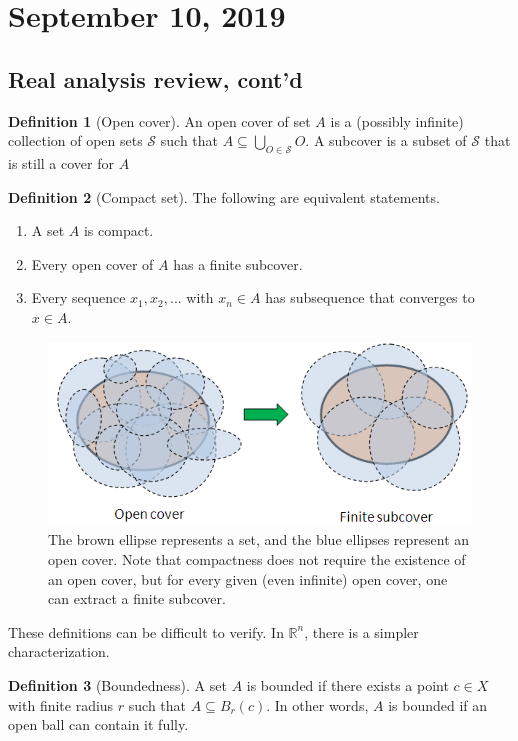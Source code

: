 \documentclass[11pt]{article}
\newcommand{\R}{\ensuremath{\mathbb R}}
\newcommand{\sse}{\subseteq}
\theoremstyle{plain}
\theoremstyle{definition}
\newtheorem{defi}{Definition}[section]
\theoremstyle{remark}
\begin{document}
\section{September 10, 2019}

\subsection{Real analysis review, cont'd}

\begin{defi}[Open cover]
    An open cover of set $A$ is a (possibly infinite) collection of open sets $\mathcal{S}$ such that $A \sse \bigcup_{O \in \mathcal{S}} O$. A subcover is a subset of $\mathcal{S}$ that is still a cover for $A$
\end{defi}
\begin{defi}[Compact set]
    The following are equivalent statements.
    \begin{enumerate}
        \item A set $A$ is compact.
        \item Every open cover of $A$ has a finite subcover.
        \item Every sequence $x_1, x_2,...$ with $x_n \in A$ has subsequence that converges to $x \in A$.
    \end{enumerate}
\end{defi}
\clearpage
\begin{figure}
    \centering
    \includegraphics[width=0.8\linewidth]{figures/finite_subcover.png}
    \caption{The brown ellipse represents a set, and the blue ellipses represent an open cover. Note that compactness does not require the existence of an open cover, but for every given (even infinite) open cover, one can extract a finite subcover.}
\end{figure}
These definitions can be difficult to verify. In $\R^n$, there is a simpler characterization.
\begin{defi}[Boundedness]
    A set $A$ is bounded if there exists a point $c \in X$ with finite radius $r$ such that $A \sse B_r(c)$. In other words, $A$ is bounded if an open ball can contain it fully.
\end{defi}
\end{document}
